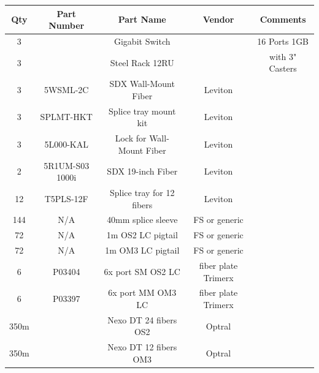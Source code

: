 \begin{flushleft}\begin{tabular}{|c|c|c|c|c|}
  \hline
  Qty & Part Number & Part Name & Vendor & Comments \\ 
  \hline
  3 &  & Gigabit Switch &  & 16 Ports 1GB \\ 
  \hline
  3 &  & Steel Rack 12RU  &  & with 3" Casters  \\ 
  \hline
  3 & 5WSML-2C & SDX Wall-Mount Fiber  & Leviton    \\ 
  \hline
  3	& SPLMT-HKT	& Splice tray mount kit	& Leviton  \\
  \hline
  3	& 5L000-KAL	& Lock for Wall-Mount Fiber 	& Leviton  \\
  \hline
  2	& 5R1UM-S03	1000i & SDX 19-inch Fiber 	& Leviton  \\
  \hline
  12 &	T5PLS-12F	& Splice tray for 12 fibers	& Leviton \\
  \hline
  144	& N/A	& 40mm splice sleeve	& FS or generic	 \\
  \hline
  72	& N/A	& 1m OS2 LC pigtail	& FS or generic  \\
  \hline
  72 &	N/A	& 1m OM3 LC pigtail	& FS or generic \\
  \hline
  6	& P03404	& 6x port SM OS2 LC & fiber plate	Trimerx  \\
  \hline
  6	& P03397	& 6x port MM OM3 LC & fiber plate	Trimerx  \\
  \hline
  350m && Nexo DT 24 fibers OS2	& Optral  \\
  \hline
  350m && Nexo DT 12 fibers OM3	& Optral \\
  \hline
  \end{tabular}\end{flushleft}


